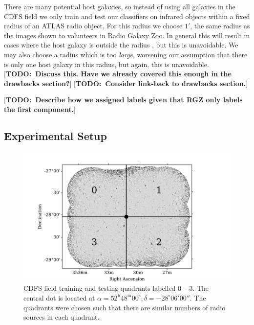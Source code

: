 \documentclass[fleqn,usenatbib,usedcolumn]{mnras}
\newcommand{\text}{\mathrm}
\newcommand{\todo}[1]{ {\color{red}[{\bf TODO:~{#1}}]} }
\begin{document}
    There are many potential host galaxies, so instead of using all galaxies
    in the CDFS field we only train and test our classifiers on infrared
    objects within a fixed radius of an ATLAS radio object. For this radius we
    choose $1'$, the same radius as the images shown to volunteers in Radio
    Galaxy Zoo. In general this will result in cases where the host galaxy is
    outside the radius \citep[e.g. the giant radio galaxy shown
    in][]{banfield15}, but this is unavoidable. We may also choose a radius
    which is too \emph{large}, worsening our assumption that there is only one
    host galaxy in this radius, but again, this is unavoidable. \todo{Discuss
    this. Have we already covered this enough in the drawbacks section?}
    \todo{Consider link-back to drawbacks section.}

    \todo{Describe how we assigned labels given that RGZ only labels the
    first component.}

  \subsection{Experimental Setup}
  \label{sec:experimental-setup}

    \begin{figure}
      \centering
      \includegraphics[width=\columnwidth]{images/quadrants.pdf}
      \caption{CDFS field training and testing quadrants labelled 0 -- 3. The
        central dot is located at $\alpha = 52^\text{h}48^\text{m}00^\text{s},
        \delta = -28^\circ{}06'00''$. The quadrants were chosen such that
        there are similar numbers of radio sources in each
        quadrant.\label{fig:quadrants}}
    \end{figure}
\end{document}
